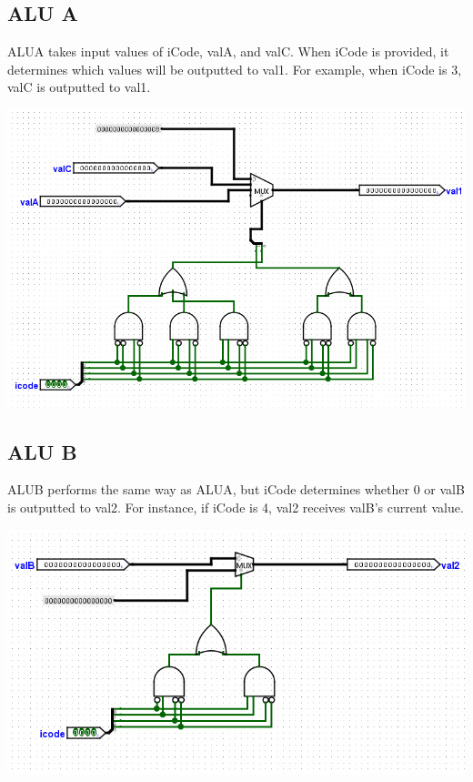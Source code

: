 \documentclass{article}
\begin{document}
\subsection{ALU A}
ALUA takes input values of iCode, valA, and valC. When iCode is provided, it determines which values will be outputted to val1. For example, when iCode is 3, valC is outputted to val1. 
\begin{center}
    \includegraphics[scale=.6]{alu_a.png} \\
\end{center}
\pagebreak

\subsection{ALU B}
ALUB performs the same way as ALUA, but iCode determines whether 0 or valB is outputted to val2. For instance, if iCode is 4, val2 receives valB's current value. 
\begin{center}
    \includegraphics[scale=.7]{alu_b.png} \\
\end{center}
\end{document}
